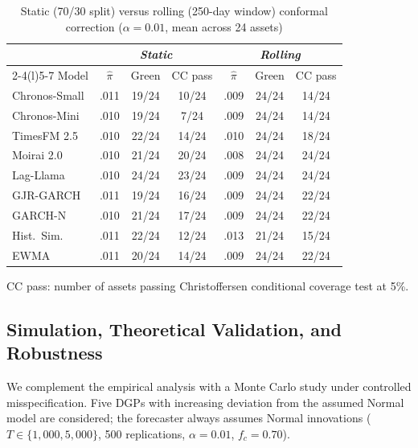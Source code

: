 \documentclass[preprint,11pt,authoryear]{elsarticle}
\newcommand{\1}{\boldsymbol{1}}
\begin{document}
	\begin{table}[H]
		\centering
		\caption{Static (70/30 split) versus rolling (250-day window) conformal correction ($\alpha = 0.01$, mean across 24 assets)}
		\label{tab:rolling_vs_static}
		\footnotesize
		\begin{tabular}{@{}lcccccc@{}}
			\toprule
			& \multicolumn{3}{c}{\textit{Static}} & \multicolumn{3}{c}{\textit{Rolling}} \\
			\cmidrule(lr){2-4}\cmidrule(l){5-7}
			Model & $\hat\pi$ & Green & CC pass & $\hat\pi$ & Green & CC pass \\
			\midrule
			Chronos-Small  & .011 & 19/24 & 10/24 & .009 & 24/24 & 14/24 \\
			Chronos-Mini   & .010 & 19/24 &  7/24 & .009 & 24/24 & 14/24 \\
			TimesFM 2.5    & .010 & 22/24 & 14/24 & .010 & 24/24 & 18/24 \\
			Moirai 2.0     & .010 & 21/24 & 20/24 & .008 & 24/24 & 24/24 \\
			Lag-Llama      & .010 & 24/24 & 23/24 & .009 & 24/24 & 24/24 \\
			\midrule
			GJR-GARCH      & .011 & 19/24 & 16/24 & .009 & 24/24 & 22/24 \\
			GARCH-N        & .010 & 21/24 & 17/24 & .009 & 24/24 & 22/24 \\
			Hist.\ Sim.    & .011 & 22/24 & 12/24 & .013 & 21/24 & 15/24 \\
			EWMA           & .011 & 20/24 & 14/24 & .009 & 24/24 & 22/24 \\
			\bottomrule
		\end{tabular}
		\begin{minipage}{\linewidth}\scriptsize
			\smallskip
			CC pass: number of assets passing Christoffersen conditional coverage test at 5\%. 
		\end{minipage}
	\end{table}
	
	
	\subsection{Simulation, Theoretical Validation, and Robustness}
	\label{sec:simulation}
	\label{sec:robust}
	
	We complement the empirical analysis with a Monte Carlo study
	under controlled misspecification. Five DGPs with increasing
	deviation from the assumed Normal model are considered; the
	forecaster always assumes Normal innovations ($T \in
	\{1{,}000, 5{,}000\}$, 500 replications, $\alpha = 0.01$,
	$f_c = 0.70$).
	
\end{document}
